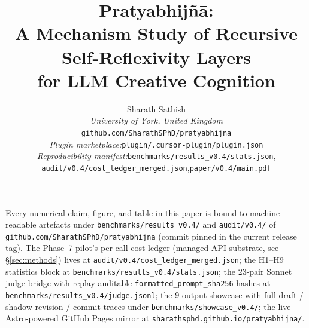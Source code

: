 \documentclass[11pt,a4paper]{article}
\title{Pratyabhij\~n\=a:\\
A Mechanism Study of Recursive Self-Reflexivity Layers\\
for LLM Creative Cognition}
\author{
  \normalsize
  Sharath Sathish\\
  \normalsize\textit{University of York, United Kingdom}\\[2pt]
  \small\nolinkurl{github.com/SharathSPhD/pratyabhijna}\\
  \small\textit{Plugin marketplace:}\;\nolinkurl{plugin/.cursor-plugin/plugin.json}\\[2pt]
  \small\textit{Reproducibility manifest:}\;\nolinkurl{benchmarks/results_v0.4/stats.json},\\[-2pt]
  \small\hphantom{\textit{Reproducibility manifest:}}\;\nolinkurl{audit/v0.4/cost_ledger_merged.json},\;\nolinkurl{paper/v0.4/main.pdf}
}
\date{}
\begin{document}
\maketitle

\begin{tcolorbox}[
  colback=yellow!8!white, colframe=yellow!50!black, arc=2pt,
  left=8pt, right=8pt, top=4pt, bottom=4pt,
  enhanced, sharp corners=southwest,
  title={Reproducibility manifest},
  fonttitle=\small\bfseries,
  breakable,
]
{\small\sloppy
Every numerical claim, figure, and table in this paper is bound to
machine-readable artefacts under
\nolinkurl{benchmarks/results_v0.4/} and \nolinkurl{audit/v0.4/} of
\nolinkurl{github.com/SharathSPhD/pratyabhijna}
(commit pinned in the current release tag). The Phase~7 pilot's
per-call cost ledger (managed-API substrate, see \S\ref{sec:methods})
lives at \nolinkurl{audit/v0.4/cost_ledger_merged.json};
the H1--H9 statistics block at \nolinkurl{benchmarks/results_v0.4/stats.json};
the 23-pair Sonnet judge bridge with replay-auditable
\texttt{formatted\_prompt\_sha256} hashes at
\nolinkurl{benchmarks/results_v0.4/judge.jsonl}; the 9-output showcase with
full draft / shadow-revision / commit traces under
\nolinkurl{benchmarks/showcase_v0.4/}; the live Astro-powered GitHub Pages
mirror at \nolinkurl{sharathsphd.github.io/pratyabhijna/}.
\par}
\end{tcolorbox}
\end{document}
